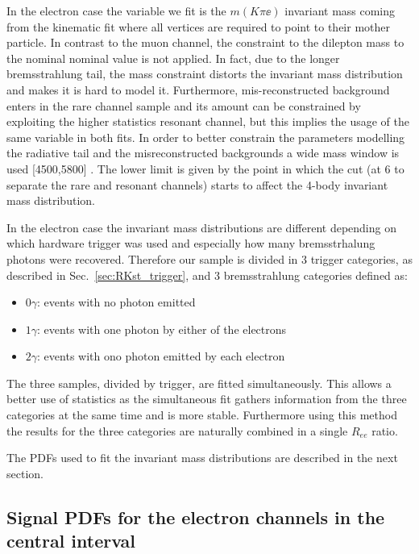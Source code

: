 In the electron case the variable we fit is the $m(K\pi\ee)$ invariant mass coming from the kinematic
fit where all vertices are required to point to their mother particle. 
In contrast to the muon channel,
the constraint to the dilepton mass to the nominal \jpsi nominal value is not applied.
In fact, due to the longer bremsstrahlung tail, the \jpsi mass constraint distorts the invariant mass distribution
and makes it is hard to model it. Furthermore, mis-reconstructed background enters in the rare channel sample and
its amount can be constrained by exploiting the higher statistics resonant channel, but this implies
the usage of the same variable in both fits.
In order to better constrain the parameters modelling the radiative tail and the misreconstructed
backgrounds a wide mass window is used [4500,5800] \mevcc. The lower limit is given
by the point in which the \qsq cut (at 6 \gevgevcccc to separate the rare and resonant channels)
starts to affect the 4-body invariant mass distribution.

In the electron case the invariant mass distributions are different depending on which hardware
trigger was used and especially how many bremsstrhalung photons were recovered.
Therefore our sample is divided in 3 trigger categories, as described in
Sec.~\ref{sec:RKst_trigger}, and 3 bremsstrahlung categories defined as:
%
\begin{itemize}
\item $0\gamma$: events with no photon emitted
\item $1\gamma$: events with one photon by either of the electrons
\item $2\gamma$: events with ono photon emitted by each electron
\end{itemize}
%
The three samples, divided by trigger, are fitted simultaneously.
This allows a better use of statistics as the simultaneous fit
gathers information from the three categories at the same time and is more stable.
Furthermore using this method the results for the three categories are
naturally combined in a single $R_{ee}$ ratio.

The PDFs used to fit the invariant mass distributions are described in the next section.



\subsection{Signal PDFs for the electron channels in the central \qsq interval}
\label{sec:fit_ee_central}

